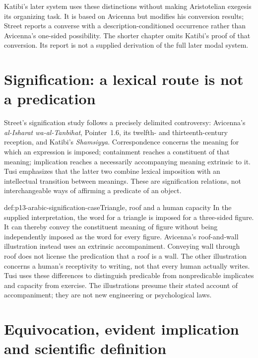 Katibi's later system uses these distinctions without making
Aristotelian exegesis its organizing task. It is based on Avicenna
but modifies his conversion results; Street reports a converse
with a description-conditioned occurrence rather than Avicenna's
one-sided possibility. The shorter chapter omits Katibi's proof
of that conversion. Its report is not a supplied derivation of
the full later modal system.
\cite[pp.~260--262]{Street2005LogicSupplement}

\section{Signification: a lexical route is not a predication}
\label{sec:p13-arabic-signification}

Street's signification study follows a precisely delimited controversy:
Avicenna's \emph{al-Isharat wa-al-Tanbihat}, Pointer~1.6, its
twelfth- and thirteenth-century reception, and Katibi's
\emph{Shamsiyya}. Correspondence concerns the meaning for
which an expression is imposed; containment reaches a constituent
of that meaning; implication reaches a necessarily accompanying
meaning extrinsic to it. Tusi emphasizes that the latter two
combine lexical imposition with an intellectual transition between
meanings. These are signification relations, not interchangeable
ways of affirming a predicate of an object.
\cite[pp.~101--108, Appendix~1]{Street2020PointersSignification}

\begin{hbexample}{def:p13-arabic-signification-case}{Triangle, roof and a human capacity}
In the supplied interpretation, the word for a triangle is imposed
for a three-sided figure. It can thereby convey the constituent
meaning of figure without being independently imposed as the word
for every figure. Avicenna's roof-and-wall illustration instead
uses an extrinsic accompaniment. Conveying wall through roof does
not license the predication that a roof is a wall. The other
illustration concerns a human's receptivity to writing, not that
every human actually writes. Tusi uses these differences to
distinguish predicable from nonpredicable implicates and capacity
from exercise. The illustrations presume their stated account
of accompaniment; they are not new engineering or psychological laws.
\cite[pp.~105--108, 124--125]{Street2020PointersSignification}
\end{hbexample}

\section{Equivocation, evident implication and scientific definition}
\label{sec:p13-arabic-postavicennan-repair}

